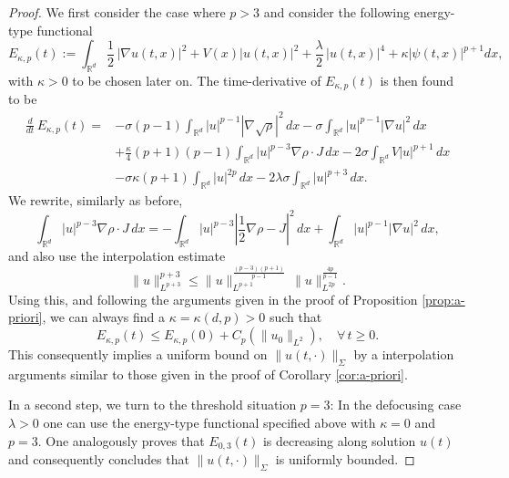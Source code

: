 \documentclass[a4paper,leqno]{amsart}
\theoremstyle{plain}
\theoremstyle{definition}
\numberwithin{equation}{section}
\begin{document}
\begin{proof} 
We first consider the case where $p>3$ and consider the following energy-type functional
\begin{equation*}\label{eq:diss_NLS_enP}
E_{\kappa, p}(t):=\int_{{{\mathbb R}}^d}\frac{1}{2}\, |\nabla u(t,x)|^2+ V(x) |u(t,x)|^2+ \frac{\lambda}{2}\, |u(t,x)|^4+\kappa|\psi(t,x)|^{p+1} d x,
\end{equation*}
with $\kappa >0$ to be chosen later on. The time-derivative of  $E_{\kappa, p}(t)$ is then found to be
\begin{align*}
\frac{d}{d t} \, E_{\kappa, p}(t)=
&-\sigma(p-1)\int_{{{\mathbb R}}^d}|u|^{p-1}|\nabla\sqrt{\rho}|^2\, d x-\sigma\int_{{{\mathbb R}}^d}|u|^{p-1}|\nabla u|^2\, d x\\
&+\frac{\kappa}{4}(p+1)(p-1)\int_{{{\mathbb R}}^d}|u|^{p-3}\nabla\rho\cdot J\, d x
-2\sigma\int_{{{\mathbb R}}^d} V|u|^{p+1}\,dx\\
& -\sigma \kappa(p+1)\int_{{{\mathbb R}}^d}|u|^{2p}\, d x -2\lambda\sigma\int_{{{\mathbb R}}^d}|u|^{p+3}\, d x.
\end{align*}
We rewrite, similarly as before,
\begin{equation*}
\int_{{{\mathbb R}}^d}|u|^{p-3}\nabla\rho\cdot J\, d x
=-\int_{{{\mathbb R}}^d}|u|^{p-3}{\left|{{\frac{1}{2}}\nabla\rho-J}\right|}^2\, d x
+\int_{{{\mathbb R}}^d}|u|^{p-1}|\nabla u|^2\, d x,
\end{equation*}
and also use the interpolation estimate
\begin{equation*}
\|u \|_{L^{p+3}}^{p+3}{\leqslant}\|u\|_{L^{p+1}}^{\frac{(p-3)(p+1)}{p-1}} \,
\|u \|_{L^{2p}}^{\frac{4p}{p-1}}.
\end{equation*}
Using this, and following the arguments given in the proof of Proposition \ref{prop:a-priori}, we can 
always find a $\kappa = \kappa(d, p)>0$ such that 
\begin{equation*}
E_{\kappa, p}(t){\leqslant} E_{\kappa, p}(0)+C_p (\|u_0\|_{L^2}), \quad \forall \, t{\geqslant} 0.
\end{equation*}
This consequently implies a uniform bound on $\| u(t, \cdot) \|_{\Sigma}$ by a interpolation arguments similar to those given in the proof of Corollary \ref{cor:a-priori}.

In a second step, we turn to the threshold situation $p=3$: In the defocusing case $\lambda >0$ one can 
use the energy-type functional specified above with $\kappa = 0$ and $p=3$. One analogously proves that $E_{0,3}(t)$  
is decreasing along solution $u(t)$ and consequently concludes that $\| u(t, \cdot) \|_{\Sigma}$ is uniformly bounded. 


\end{proof}
\end{document}
